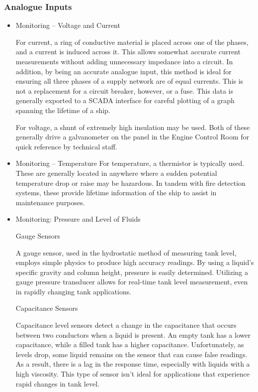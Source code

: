 \documentclass[11pt,a4paper]{article}
\begin{document}
\subsubsection*{Analogue Inputs}
\begin{itemize}
\item Monitoring – Voltage and Current

For current, a ring of conductive material is placed across one of the phases, and a current is induced across it. This allows somewhat accurate current measurements without adding unnecessary impedance into a circuit. In addition, by being an accurate analogue input, this method is ideal for ensuring all three phases of a supply network are of equal currents. This is not a replacement for a circuit breaker, however, or a fuse. This data is generally exported to a SCADA interface for careful plotting of a graph spanning the lifetime of a ship.

For voltage, a shunt of extremely high insulation may be used. Both of these generally drive a galvanometer on the panel in the Engine Control Room for quick reference by technical staff.
\item Monitoring – Temperature
For temperature, a thermistor is typically used. These are generally located in anywhere where a sudden potential temperature drop or raise may be hazardous. In tandem with fire detection systems, these provide lifetime information of the ship to assist in maintenance purposes.

\item Monitoring: Pressure and Level of Fluids

Gauge Sensors

A gauge sensor, used in the hydrostatic method of measuring tank level, employs simple physics to produce high accuracy readings.  By using a liquid's specific gravity and column height, pressure is easily determined. Utilizing a gauge pressure transducer allows for real-time tank level measurement, even in rapidly changing tank applications.

Capacitance Sensors

Capacitance level sensors detect a change in the capacitance that occurs between two conductors when a liquid is present. An empty tank has a lower capacitance, while a filled tank has a higher capacitance. Unfortunately, as levels drop, some liquid remains on the sensor that can cause false readings. As a result, there is a lag in the response time, especially with liquids with a high viscosity. This type of sensor isn't ideal for applications that experience rapid changes in tank level.


\end{itemize}
\end{document}
